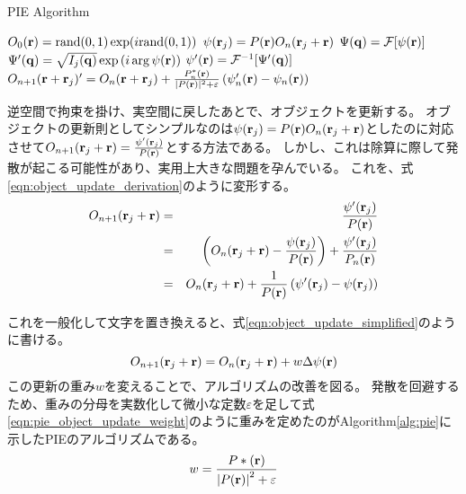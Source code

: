 \begin{algorithm}                      
\caption{PIE Algorithm}         
\label{alg:pie}                          
\begin{algorithmic}
    \STATE $O_0(\mathbf{r}) = \mathrm{rand}(0,1) \exp(i \mathrm{rand}(0,1) )$
        \STATE $\psi(\mathbf{r}_j) = P(\mathbf{r}) O_n(\mathbf{r}_j + \mathbf{r})$
        \STATE $\Psi(\mathbf{q}) = \mathcal F [\psi(\mathbf{r})]$
        \STATE $\Psi'(\mathbf{q}) = \sqrt{I_j(\mathbf{q})} \exp\left( i \arg \psi(\mathbf{r}) \right)$ 
        \STATE $\psi'(\mathbf{r}) = \mathcal F^{-1} [\Psi'(\mathbf{q})]$
        \STATE $O_{n+1}(\mathbf{r} + \mathbf{r}_j)'
          = O_n(\mathbf{r} + \mathbf{r}_j) 
          + \frac{P_n^*(\mathbf{r})}{|P(\mathbf{r})|^2+\varepsilon} \left( \psi_n'(\mathbf{r}) - \psi_n(\mathbf{r}) \right)$
      \ENDFOR
    \ENDFOR
\end{algorithmic}
\end{algorithm}

逆空間で拘束を掛け、実空間に戻したあとで、オブジェクトを更新する。
オブジェクトの更新則としてシンプルなのは$\psi(\mathbf{r}_j) = P(\mathbf{r}) O_n(\mathbf{r}_j + \mathbf{r})$としたのに対応させて$O_{n+1}(\mathbf{r}_j + \mathbf{r}) = \frac{\psi'(\mathbf{r}_j)}{P(\mathbf{r})}$とする方法である。
しかし、これは除算に際して発散が起こる可能性があり、実用上大きな問題を孕んでいる。
これを、式\ref{eqn:object_update_derivation}のように変形する。
\begin{eqnarray}
O_{n+1}(\mathbf{r}_j + \mathbf{r})
  &=& \frac{\psi'(\mathbf{r}_j)}{P(\mathbf{r})} \nonumber \\
  &=& \left( O_n(\mathbf{r}_j + \mathbf{r}) - \frac{\psi(\mathbf{r}_j)}{P(\mathbf{r})} \right) + \frac{\psi'(\mathbf{r}_j)}{P_n(\mathbf{r})} \nonumber \\
  &=& O_n(\mathbf{r}_j + \mathbf{r}) + \frac{1}{P(\mathbf{r})} \left( \psi'(\mathbf{r}_j) - \psi(\mathbf{r}_j) \right) \label{eqn:object_update_derivation}
\end{eqnarray}

これを一般化して文字を置き換えると、式\ref{eqn:object_update_simplified}のように書ける。
\begin{equation}
\label{eqn:object_update_simplified}
  O_{n+1}(\mathbf{r}_j + \mathbf{r}) = O_n(\mathbf{r}_j + \mathbf{r}) + w \Delta\psi(\mathbf{r})
\end{equation}
この更新の重み$w$を変えることで、アルゴリズムの改善を図る。
発散を回避するため、重みの分母を実数化して微小な定数$\varepsilon$を足して式\ref{eqn:pie_object_update_weight}のように重みを定めたのがAlgorithm\ref{alg:pie}に示したPIEのアルゴリズムである。
\begin{equation}
  \label{eqn:pie_object_update_weight}
  w = \frac{P*(\mathbf{r})}{\left| P(\mathbf{r}) \right|^2 + \varepsilon}
\end{equation}

